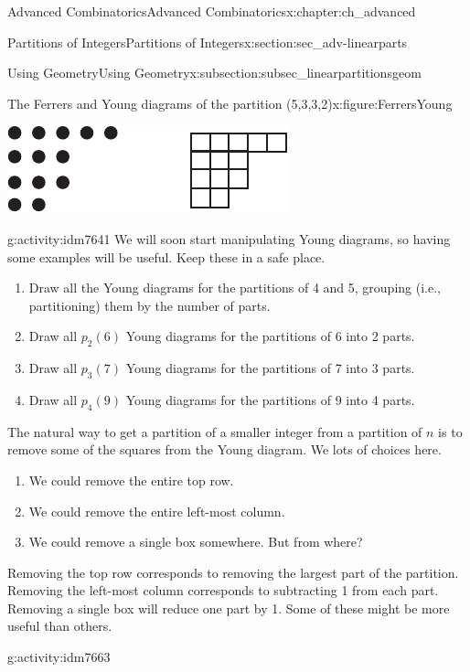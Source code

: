 \documentclass[oneside,10pt,]{book}
\numberwithin{equation}{chapter}
\begin{document}
\begin{chapterptx}{Advanced Combinatorics}{}{Advanced Combinatorics}{}{}{x:chapter:ch_advanced}
\begin{sectionptx}{Partitions of Integers}{}{Partitions of Integers}{}{}{x:section:sec_adv-linearparts}
\begin{subsectionptx}{Using Geometry}{}{Using Geometry}{}{}{x:subsection:subsec_linearpartitionsgeom}
\begin{figureptx}{The Ferrers and Young diagrams of the partition (5,3,3,2)}{x:figure:FerrersYoung}%
\begin{image}{0.275}{0.45}{0.275}%
\includegraphics[width=\linewidth]{images/FerrersYoung}
\end{image}%
\tcblower
\end{figureptx}%
\begin{activity}{}{g:activity:idm7641}%
We will soon start manipulating Young diagrams, so having some examples will be useful.  Keep these in a safe place.\begin{enumerate}[font=\bfseries,label=(\alph*),ref=\alph*]
\item{}Draw all the Young diagrams for the partitions of 4 and 5, grouping (i.e., partitioning) them by the number of parts.%
\item{}Draw all \(p_2(6)\) Young diagrams for the partitions of 6 into 2 parts.%
\item{}Draw all \(p_3(7)\) Young diagrams for the partitions of 7 into 3 parts.%
\item{} Draw all \(p_4(9)\) Young diagrams for the partitions of 9 into 4 parts.%
\end{enumerate}
\end{activity}
The natural way to get a partition of a smaller integer from a partition of \(n\) is to remove some of the squares from the Young diagram.  We lots of choices here.%
\begin{enumerate}
\item{}We could remove the entire top row.%
\item{}We could remove the entire left-most column.%
\item{}We could remove a single box somewhere. But from where?%
\end{enumerate}
Removing the top row corresponds to removing the largest part of the partition.  Removing the left-most column corresponds to subtracting 1 from each part.  Removing a single box will reduce one part by 1.  Some of these might be more useful than others.%
\begin{activity}{}{g:activity:idm7663}%

\end{activity}
\end{subsectionptx}
\end{sectionptx}
\end{chapterptx}
\end{document}
